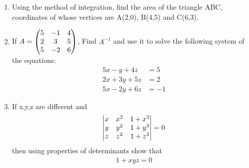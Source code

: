 \documentclass[journal,12pt,twocolumn]{IEEEtran}
\renewcommand\thesection{\arabic{section}}
\begin{document}
\begin{enumerate}[label=\thesection.\arabic*.,ref=\thesection.\theenumi]
\item Using the method of integration, find the area of the triangle ABC, coordinates of whose vertices are A(2,0), B(4,5) and C(6,3).\\
\item If $A=\begin{pmatrix}5 & -1 & 4 \\ 2 & 3 & 5 \\ 5 & -2 & 6\end{pmatrix} $, Find $A^{-1}$ and use it to solve the following system of the equations: \\
\begin{align}
	5x-y+4z &= 5 \nonumber \\
	2x+3y+5z &= 2 \nonumber \\
	5x-2y+6z &= -1 
\nonumber
\end{align}
    
\item If x,y,z are different and \begin{align} \begin{vmatrix}x & x^2 & 1+x^3 \\ y & y^2 & 1+y^3 \\ z & z^2 & 1+z^3\end{vmatrix}=0 \nonumber \end{align} then using properties of determinants show that \begin{align} 1+xyz=0 \nonumber \end{align}
\end{enumerate}
\end{document}

